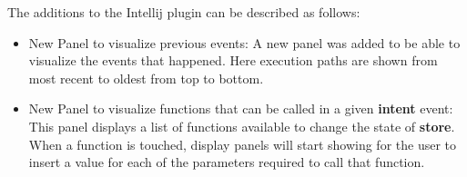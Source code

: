 The additions to the Intellij plugin can be described as follows:

\begin{itemize}
	\item New Panel to visualize previous events: A new panel was added to be able to visualize the events that happened. Here execution paths are shown from most recent to oldest from top to bottom.  
	\item New Panel to visualize functions that can be called in a given \textbf{intent} event: This panel displays a list of functions available to change the state of \textbf{store}. When a function is touched, display panels will start showing for the user to insert a value for each of the parameters required to call that function.
\end{itemize}


\endinput
